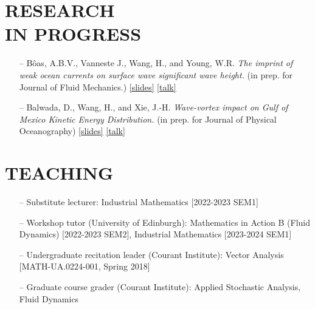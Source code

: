 \documentclass[margin]{res}
\begin{document}
\begin{resume}
\section{{\normalfont RESEARCH\\IN PROGRESS}}
\begin{itemize}

\item[--] B\^{o}as, A.B.V., Vanneste J.,  Wang, H., and Young, W.R. \textit{The imprint of weak ocean currents on surface wave significant wave height.}  (in prep. for Journal of Fluid Mechanics.) \href{https://hannnwang.github.io/surfacewaves_WISE.pdf}{[slides]}  \href{https://www.youtube.com/watch?v=migsRGIAB-c}{[talk]}
\item[--] Balwada, D., Wang, H., and Xie, J.-H. \textit{Wave-vortex impact on Gulf of Mexico Kinetic Energy Distribution.} (in prep. for Journal of Physical Oceanography) \href{https://hannnwang.github.io/slide_trr_2023.pdf}{[slides]}  \href{https://www.youtube.com/watch?v=3HQ-iV7y3gI}{[talk]}    
\end{itemize}

\section{{\normalfont TEACHING}}
\begin{itemize}[leftmargin=*,noitemsep]
\item[--]{Substitute lecturer: Industrial Mathematics [2022-2023 SEM1]}
\item[--]{Workshop tutor (University of Edinburgh): Mathematics in Action B (Fluid Dynamics) [2022-2023 SEM2], Industrial Mathematics [2023-2024 SEM1]}
\item[--]{Undergraduate recitation leader  (Courant Institute): Vector Analysis [MATH-UA.0224-001, Spring 2018]}
\item[--]{Graduate course grader  (Courant Institute): Applied Stochastic Analysis, Fluid Dynamics}
\end{itemize}

\end{resume}
\end{document}
